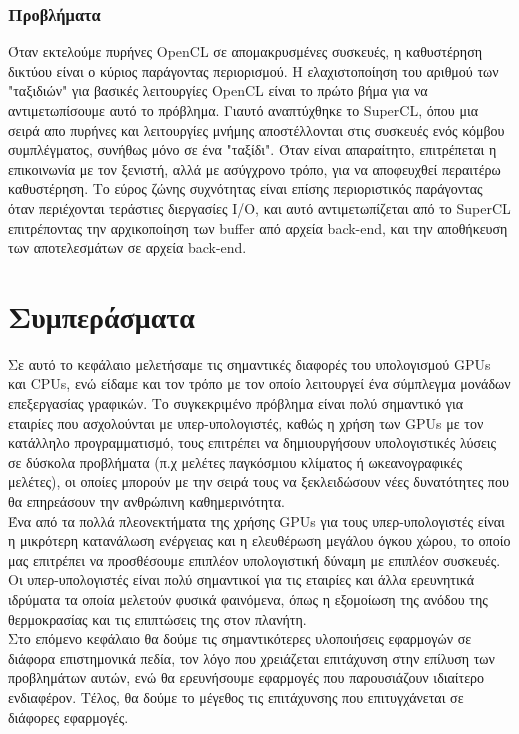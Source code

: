 \subsubsection{Προβλήματα}
Όταν εκτελούμε πυρήνες OpenCL σε απομακρυσμένες συσκευές, η καθυστέρηση δικτύου είναι ο κύριος παράγοντας περιορισμού. Η ελαχιστοποίηση του αριθμού των "ταξιδιών" για βασικές λειτουργίες OpenCL είναι το πρώτο βήμα για να αντιμετωπίσουμε αυτό το πρόβλημα. Γιαυτό αναπτύχθηκε το SuperCL, όπου μια σειρά απο πυρήνες και λειτουργίες μνήμης αποστέλλονται στις συσκευές ενός κόμβου συμπλέγματος, συνήθως μόνο σε ένα "ταξίδι". Όταν είναι απαραίτητο, επιτρέπεται η επικοινωνία με τον ξενιστή, αλλά με ασύγχρονο τρόπο, για να αποφευχθεί περαιτέρω καθυστέρηση. Το εύρος ζώνης συχνότητας είναι επίσης περιοριστικός παράγοντας όταν περιέχονται τεράστιες διεργασίες I/O, και αυτό αντιμετωπίζεται από το SuperCL επιτρέποντας την αρχικοποίηση των buffer από αρχεία back-end, και την αποθήκευση των αποτελεσμάτων σε αρχεία back-end.\cite{virtualcl-5}

\section{Συμπεράσματα}
Σε αυτό το κεφάλαιο μελετήσαμε τις σημαντικές διαφορές του υπολογισμού GPUs και CPUs, ενώ είδαμε και τον τρόπο με τον οποίο λειτουργεί ένα σύμπλεγμα μονάδων επεξεργασίας γραφικών. Το συγκεκριμένο πρόβλημα είναι πολύ σημαντικό για εταιρίες που ασχολούνται με υπερ-υπολογιστές, καθώς η χρήση των GPUs με τον κατάλληλο προγραμματισμό, τους επιτρέπει να δημιουργήσουν υπολογιστικές λύσεις σε δύσκολα προβλήματα (π.χ μελέτες παγκόσμιου κλίματος ή ωκεανογραφικές μελέτες), οι οποίες μπορούν με την σειρά τους να ξεκλειδώσουν νέες δυνατότητες που θα επηρεάσουν την ανθρώπινη καθημερινότητα.\\

Ένα από τα πολλά πλεονεκτήματα της χρήσης GPUs για τους υπερ-υπολογιστές είναι η μικρότερη κατανάλωση ενέργειας και η ελευθέρωση μεγάλου όγκου χώρου, το οποίο μας επιτρέπει να προσθέσουμε επιπλέον υπολογιστική δύναμη με επιπλέον συσκευές. Οι υπερ-υπολογιστές είναι πολύ σημαντικοί για τις εταιρίες και άλλα ερευνητικά ιδρύματα τα οποία μελετούν φυσικά φαινόμενα, όπως η εξομοίωση της ανόδου της θερμοκρασίας και τις επιπτώσεις της στον πλανήτη.\\

Στο επόμενο κεφάλαιο θα δούμε τις σημαντικότερες υλοποιήσεις εφαρμογών σε διάφορα επιστημονικά πεδία, τον λόγο που χρειάζεται επιτάχυνση στην επίλυση των προβλημάτων αυτών, ενώ θα ερευνήσουμε εφαρμογές που παρουσιάζουν ιδιαίτερο ενδιαφέρον. Τέλος, θα δούμε το μέγεθος τις επιτάχυνσης που επιτυγχάνεται σε διάφορες εφαρμογές.